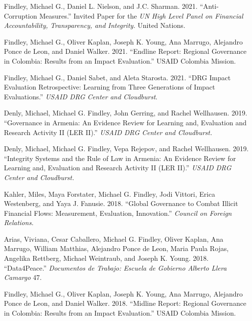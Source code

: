 \documentclass[10pt]{article}
\begin{document}
\begin{etaremune}

\item Findley, Michael G., Daniel L. Nielson, and J.C. Sharman. 2021. ``Anti-Corruption Measures.'' Invited Paper for the \textit{UN High Level Panel on Financial Accountability, Transparency, and Integrity.} United Nations.

\item Findley, Michael G., Oliver Kaplan, Joseph K. Young, Ana Marrugo, Alejandro Ponce de Leon, and Daniel Walker. 2021. ``Endline Report: Regional Governance in Colombia: Results from an Impact Evaluation.'' USAID Colombia Mission. 

\item Findley, Michael G., Daniel Sabet, and Aleta Starosta. 2021. ``DRG Impact Evaluation Retrospective: Learning from Three Generations of Impact Evaluations.'' \textit{USAID DRG Center and Cloudburst}.

\item Denly, Michael, Michael G. Findley, John Gerring, and Rachel Wellhausen. 2019. ``Governance in Armenia: An Evidence Review for Learning and, Evaluation and Research Activity II (LER II).'' \textit{USAID DRG Center and Cloudburst.}

\item Denly, Michael, Michael G. Findley, Vepa Rejepov, and Rachel Wellhausen. 2019. ``Integrity Systems and the Rule of Law in Armenia: An Evidence Review for Learning and, Evaluation and Research Activity II (LER II).'' \textit{USAID DRG Center and Cloudburst.}

\item Kahler, Miles, Maya Forstater, Michael G. Findley, Jodi Vittori, Erica Westenberg, and Yaya J. Fanusie. 2018. ``Global Governance to Combat Illicit Financial Flows: Measurement, Evaluation,  Innovation.'' \textit{Council on Foreign Relations.} 

\item Arias, Viviana, Cesar Caballero, Michael G. Findley, Oliver Kaplan, Ana Marrugo, William Matthias, Alejandro Ponce de Leon, Maria Paula Rojas, Angelika Rettberg, Michael Weintraub, and Joseph K. Young. 2018. ``Data4Peace.'' \textit{Documentos de Trabajo: Escuela de Gobierno Alberto Llera Camargo} 47. 

\item Findley, Michael G., Oliver Kaplan, Joseph K. Young, Ana Marrugo, Alejandro Ponce de Leon, and Daniel Walker. 2018. ``Midline Report: Regional Governance in Colombia: Results from an Impact Evaluation.'' USAID Colombia Mission. 


\end{etaremune}
\end{document}
